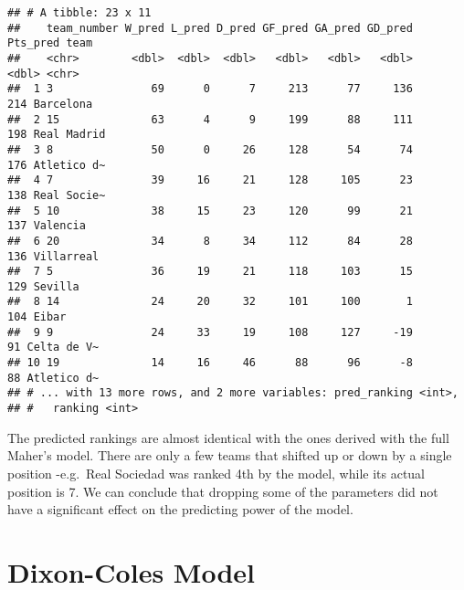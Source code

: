 \documentclass[
]{article}
\newenvironment{Shaded}{\begin{snugshade}}{\end{snugshade}}
\newcommand{\DecValTok}[1]{\textcolor[rgb]{0.00,0.00,0.81}{#1}}
\newcommand{\FunctionTok}[1]{\textcolor[rgb]{0.00,0.00,0.00}{#1}}
\newcommand{\NormalTok}[1]{#1}
\newcommand{\OtherTok}[1]{\textcolor[rgb]{0.56,0.35,0.01}{#1}}
\newcommand{\SpecialCharTok}[1]{\textcolor[rgb]{0.00,0.00,0.00}{#1}}
\newcommand{\StringTok}[1]{\textcolor[rgb]{0.31,0.60,0.02}{#1}}
\begin{document}
\begin{Shaded}
\end{Shaded}

\begin{verbatim}
## # A tibble: 23 x 11
##    team_number W_pred L_pred D_pred GF_pred GA_pred GD_pred Pts_pred team       
##    <chr>        <dbl>  <dbl>  <dbl>   <dbl>   <dbl>   <dbl>    <dbl> <chr>      
##  1 3               69      0      7     213      77     136      214 Barcelona  
##  2 15              63      4      9     199      88     111      198 Real Madrid
##  3 8               50      0     26     128      54      74      176 Atletico d~
##  4 7               39     16     21     128     105      23      138 Real Socie~
##  5 10              38     15     23     120      99      21      137 Valencia   
##  6 20              34      8     34     112      84      28      136 Villarreal 
##  7 5               36     19     21     118     103      15      129 Sevilla    
##  8 14              24     20     32     101     100       1      104 Eibar      
##  9 9               24     33     19     108     127     -19       91 Celta de V~
## 10 19              14     16     46      88      96      -8       88 Atletico d~
## # ... with 13 more rows, and 2 more variables: pred_ranking <int>,
## #   ranking <int>
\end{verbatim}

The predicted rankings are almost identical with the ones derived with
the full Maher's model. There are only a few teams that shifted up or
down by a single position -e.g.~Real Sociedad was ranked 4th by the
model, while its actual position is 7. We can conclude that dropping
some of the parameters did not have a significant effect on the
predicting power of the model.

\hypertarget{dixon-coles-model}{%
\section{Dixon-Coles Model}\label{dixon-coles-model}}
\end{document}
